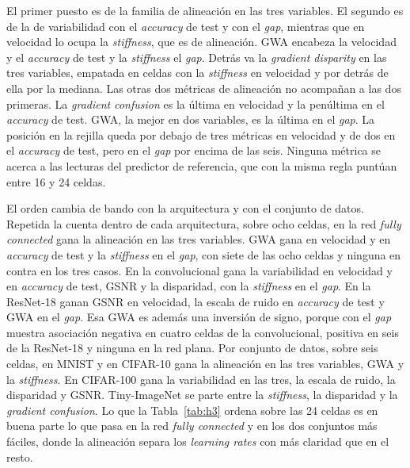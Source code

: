 El primer puesto es de la familia de alineación en las tres variables. El segundo es de la de variabilidad con el \emph{accuracy} de test y con el \emph{gap}, mientras que en velocidad lo ocupa la \emph{stiffness}, que es de alineación. GWA encabeza la velocidad y el \emph{accuracy} de test y la \emph{stiffness} el \emph{gap}. Detrás va la \emph{gradient disparity} en las tres variables, empatada en celdas con la \emph{stiffness} en velocidad y por detrás de ella por la mediana. Las otras dos métricas de alineación no acompañan a las dos primeras. La \emph{gradient confusion} es la última en velocidad y la penúltima en el \emph{accuracy} de test. GWA, la mejor en dos variables, es la última en el \emph{gap}. La posición en la rejilla queda por debajo de tres métricas en velocidad y de dos en el \emph{accuracy} de test, pero en el \emph{gap} por encima de las seis. Ninguna métrica se acerca a las lecturas del predictor de referencia, que con la misma regla puntúan entre 16 y 24 celdas.

El orden cambia de bando con la arquitectura y con el conjunto de datos. Repetida la cuenta dentro de cada arquitectura, sobre ocho celdas, en la red \emph{fully connected} gana la alineación en las tres variables. GWA gana en velocidad y en \emph{accuracy} de test y la \emph{stiffness} en el \emph{gap}, con siete de las ocho celdas y ninguna en contra en los tres casos. En la convolucional gana la variabilidad en velocidad y en \emph{accuracy} de test, GSNR y la disparidad, con la \emph{stiffness} en el \emph{gap}. En la ResNet-18 ganan GSNR en velocidad, la escala de ruido en \emph{accuracy} de test y GWA en el \emph{gap}. Esa GWA es además una inversión de signo, porque con el \emph{gap} muestra asociación negativa en cuatro celdas de la convolucional, positiva en seis de la ResNet-18 y ninguna en la red plana. Por conjunto de datos, sobre seis celdas, en MNIST y en CIFAR-10 gana la alineación en las tres variables, GWA y la \emph{stiffness}. En CIFAR-100 gana la variabilidad en las tres, la escala de ruido, la disparidad y GSNR. Tiny-ImageNet se parte entre la \emph{stiffness}, la disparidad y la \emph{gradient confusion}. Lo que la Tabla~\ref{tab:h3} ordena sobre las 24 celdas es en buena parte lo que pasa en la red \emph{fully connected} y en los dos conjuntos más fáciles, donde la alineación separa los \emph{learning rates} con más claridad que en el resto.

